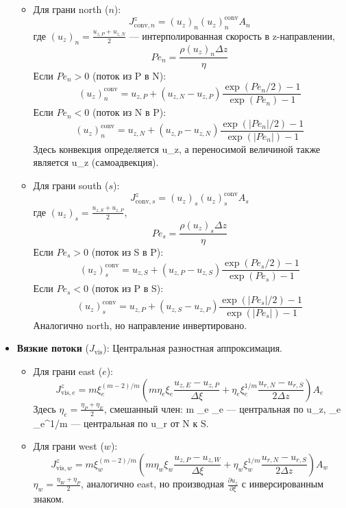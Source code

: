 \documentclass[a4paper,12pt]{article}
\begin{document}
\begin{itemize}
\begin{itemize}
        \item Для грани north (\(n\)):
        \[
        J_{\text{conv},n}^z = (u_z)_n (u_z)_n^{\text{conv}} A_n
        \]
        где \((u_z)_n = \frac{u_{z,P} + u_{z,N}}{2}\) — интерполированная скорость в z-направлении,
        \[
        Pe_n = \frac{\rho (u_z)_n \Delta z}{\eta}
        \]
        Если \(Pe_n > 0\) (поток из P в N):
        \[
        (u_z)_n^{\text{conv}} = u_{z,P} + (u_{z,N} - u_{z,P}) \frac{\exp(Pe_n / 2) - 1}{\exp(Pe_n) - 1}
        \]
        Если \(Pe_n < 0\) (поток из N в P):
        \[
        (u_z)_n^{\text{conv}} = u_{z,N} + (u_{z,P} - u_{z,N}) \frac{\exp(|Pe_n| / 2) - 1}{\exp(|Pe_n|) - 1}
        \]
        Здесь конвекция определяется u_z, а переносимой величиной также является u_z (самоадвекция).

        \item Для грани south (\(s\)):
        \[
        J_{\text{conv},s}^z = (u_z)_s (u_z)_s^{\text{conv}} A_s
        \]
        где \((u_z)_s = \frac{u_{z,S} + u_{z,P}}{2}\),
        \[
        Pe_s = \frac{\rho (u_z)_s \Delta z}{\eta}
        \]
        Если \(Pe_s > 0\) (поток из S в P):
        \[
        (u_z)_s^{\text{conv}} = u_{z,S} + (u_{z,P} - u_{z,S}) \frac{\exp(Pe_s / 2) - 1}{\exp(Pe_s) - 1}
        \]
        Если \(Pe_s < 0\) (поток из P в S):
        \[
        (u_z)_s^{\text{conv}} = u_{z,P} + (u_{z,S} - u_{z,P}) \frac{\exp(|Pe_s| / 2) - 1}{\exp(|Pe_s|) - 1}
        \]
        Аналогично north, но направление инвертировано.
    \end{itemize}
    \item \textbf{Вязкие потоки} (\(J_{\text{vis}}\)): Центральная разностная аппроксимация.
    \begin{itemize}
        \item Для грани east (\(e\)):
        \[
        J_{\text{vis},e}^z = m \xi_e^{(m-2)/m} \left( m \eta_e \xi_e \frac{u_{z,E} - u_{z,P}}{\Delta \xi} + \eta_e \xi_e^{1/m} \frac{u_{r,N} - u_{r,S}}{2 \Delta z} \right) A_e
        \]
        Здесь \(\eta_e = \frac{\eta_P + \eta_E}{2}\), смешанный член: m \eta_e \xi_e  — центральная по u_z, \eta_e \xi_e^{1/m}  — центральная по u_r от N к S.

        \item Для грани west (\(w\)):
        \[
        J_{\text{vis},w}^z = m \xi_w^{(m-2)/m} \left( m \eta_w \xi_w \frac{u_{z,P} - u_{z,W}}{\Delta \xi} + \eta_w \xi_w^{1/m} \frac{u_{r,N} - u_{r,S}}{2 \Delta z} \right) A_w
        \]
        \(\eta_w = \frac{\eta_W + \eta_P}{2}\), аналогично east, но производная \(\frac{\partial u_z}{\partial \xi}\) с инверсированным знаком.


\end{itemize}
\end{itemize}
\end{document}
